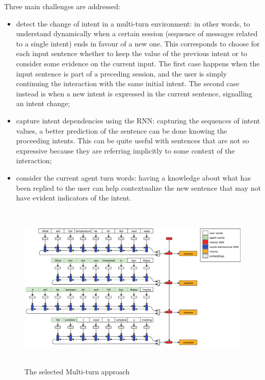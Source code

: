 Three main challenges are addressed:

\begin{itemize}
	\item detect the change of intent in a multi-turn environment: in other words, to understand dynamically when a certain session (sequence of messages related to a single intent) ends in favour of a new one. This corresponds to choose for each input sentence whether to keep the value of the previous intent or to consider some evidence on the current input. The first case happens when the input sentence is part of a preceding session, and the user is simply continuing the interaction with the same initial intent. The second case instead is when a new intent is expressed in the current sentence, signalling an intent change;

	\item capture intent dependencies using the RNN: capturing the sequences of intent values, a better prediction of the sentence can be done knowing the proceeding intents. This can be quite useful with sentences that are not so expressive because they are referring implicitly to some context of the interaction;

	\item consider the current agent turn words: having a knowledge about what has been replied to the user can help contextualize the new sentence that may not have evident indicators of the intent.
\end{itemize}

\begin{figure}[!htb]
    \centering
    \includegraphics[max width=0.9\linewidth,max height=8cm,keepaspectratio]{figures/approachMultiTurn}
    \caption{The selected Multi-turn approach}\label{fig:approachMultiTurn}
\end{figure}

